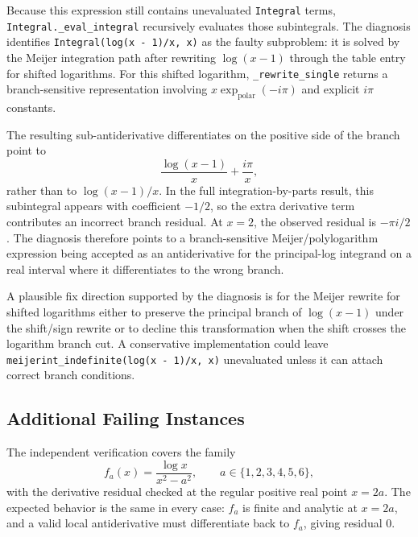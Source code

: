 \documentclass[11pt]{article}
\begin{document}
Because this expression still contains unevaluated \texttt{Integral} terms, \texttt{Integral.\_eval\_integral} recursively evaluates those subintegrals. The diagnosis identifies \texttt{Integral(log(x - 1)/x, x)} as the faulty subproblem: it is solved by the Meijer integration path after rewriting \(\log(x-1)\) through the table entry for shifted logarithms. For this shifted logarithm, \texttt{\_rewrite\_single} returns a branch-sensitive representation involving \(x\exp_{\mathrm{polar}}(-i\pi)\) and explicit \(i\pi\) constants.

The resulting sub-antiderivative differentiates on the positive side of the branch point to
\[
\frac{\log(x-1)}{x}+\frac{i\pi}{x},
\]
rather than to \(\log(x-1)/x\). In the full integration-by-parts result, this subintegral appears with coefficient \(-1/2\), so the extra derivative term contributes an incorrect branch residual. At \(x=2\), the observed residual is \(-\pi i/2\). The diagnosis therefore points to a branch-sensitive Meijer/polylogarithm expression being accepted as an antiderivative for the principal-log integrand on a real interval where it differentiates to the wrong branch.

A plausible fix direction supported by the diagnosis is for the Meijer rewrite for shifted logarithms either to preserve the principal branch of \(\log(x-1)\) under the shift/sign rewrite or to decline this transformation when the shift crosses the logarithm branch cut. A conservative implementation could leave \texttt{meijerint\_indefinite(log(x - 1)/x, x)} unevaluated unless it can attach correct branch conditions.

\subsection{Additional Failing Instances}

The independent verification covers the family
\[
f_a(x)=\frac{\log x}{x^2-a^2}, \qquad a\in\{1,2,3,4,5,6\},
\]
with the derivative residual checked at the regular positive real point \(x=2a\). The expected behavior is the same in every case: \(f_a\) is finite and analytic at \(x=2a\), and a valid local antiderivative must differentiate back to \(f_a\), giving residual \(0\).
\end{document}
